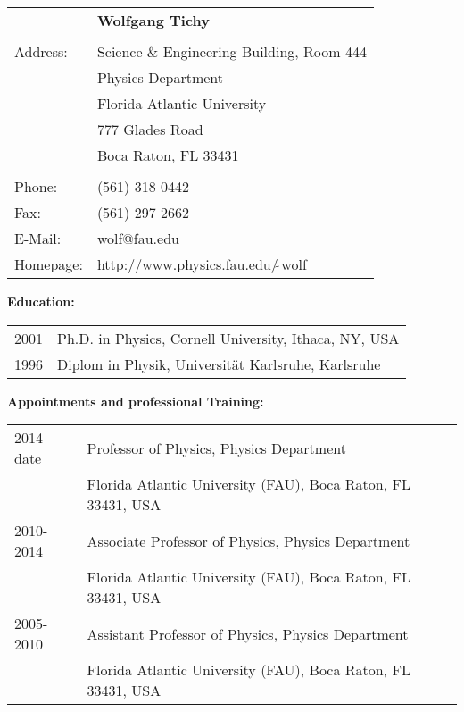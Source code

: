 \documentclass[11pt]{article}
\begin{document}
\begin{center}

\begin{tabular}{ll}
		&{\large \bf Wolfgang Tichy}\\\\
Address:	& Science \& Engineering Building, Room 444 \\
		& Physics Department\\
		& Florida Atlantic University\\
		& 777 Glades Road\\
		& Boca Raton, FL 33431\\\\

Phone:		& (561) 318 0442\\
Fax:		& (561) 297 2662\\

E-Mail:		& wolf@fau.edu \\

Homepage: 	& http://www.physics.fau.edu/$\tilde{\ }$wolf \\


\end{tabular}

\end{center}


\bigskip
{\bf Education:}\\

\begin{tabular}{ll}
{2001}&  Ph.D. in Physics, Cornell University,
	  Ithaca, NY, USA \\
{1996}&  Diplom in Physik, Universit\"at Karlsruhe,
	   Karlsruhe\\ 
\end{tabular}

\bigskip

{\bf Appointments and professional Training:}\\

\begin{tabular}{ll}
{2014-date}	& Professor of Physics,
		  {Physics Department}\\
		& {Florida Atlantic University (FAU),}
		  {Boca Raton, FL 33431, USA}\\

{2010-2014}	& Associate Professor of Physics,
		  {Physics Department}\\
		& {Florida Atlantic University (FAU),}
		  {Boca Raton, FL 33431, USA}\\

{2005-2010}	& Assistant Professor of Physics,
		  {Physics Department}\\
		& {Florida Atlantic University (FAU),}
		  {Boca Raton, FL 33431, USA}\\

\end{tabular}
\end{document}
